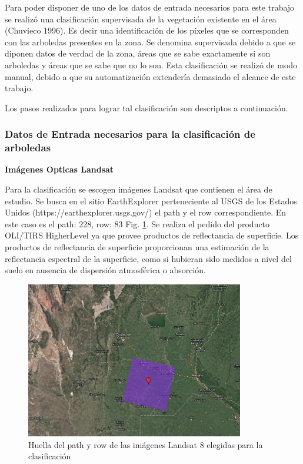 \documentclass[10pt,a4paper, twoside]{report}
\begin{document}
Para poder disponer de uno de los datos de entrada necesarios para este trabajo se realizó una clasificación supervisada de la vegetación existente en el área (Chuvieco 1996). Es decir una identificación de los píxeles que se corresponden con las arboledas presentes en la zona. Se denomina supervisada debido a que se diponen datos de verdad de la zona, áreas que se sabe exactamente si son arboledas y áreas que se sabe que no lo son. Esta clasificación se realizó de modo manual, debido a que su automatización extendería demasiado el alcance de este trabajo.

Los pasos realizados para lograr tal clasificación son descriptos a continuación.

\subsubsection{Datos de Entrada necesarios para la clasificación de arboledas}


\textbf{Imágenes Opticas Landsat}
\label{imagenesLandsat}

Para la clasificación se escogen imágenes Landsat que contienen el área de estudio. Se busca en el sitio EarthExplorer perteneciente al USGS de los Estados Unidos (https://earthexplorer.usgs.gov/) el path y el row correspondiente. En este caso es el path: 228, row: 83 Fig. \ref{footprintLandsat}. Se realiza el pedido del producto OLI/TIRS HigherLevel ya que provee productos de reflectancia de superficie. Los productos de reflectancia de superficie proporcionan una estimación de la reflectancia espectral de la superficie, como si hubieran sido medidos a nivel del suelo en ausencia de dispersión atmosférica o absorción. \cite{OLITIRS} 

\begin{figure}[!htb]
   \centering      
   \includegraphics[width=0.85\textwidth]{imagenes/FootLandsat228_83.jpg}
 \caption{Huella del path y row de las imágenes Landsat 8 elegidas para la clasificación}
 \label{footprintLandsat}
\end{figure}
\end{document}
